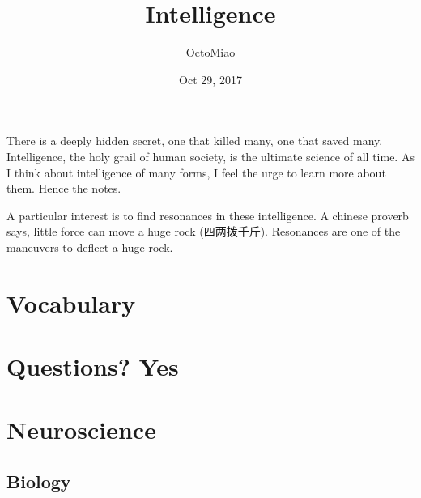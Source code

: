 \documentclass[letterpaper,10pt,english]{sphinxmanual}
\title{Intelligence}
\date{Oct 29, 2017}
\author{OctoMiao}
\begin{document}
\maketitle
\sphinxtableofcontents
{}\label{\detokenize{index::doc}}


There is a deeply hidden secret, one that killed many, one that saved many. Intelligence, the holy grail of human society, is the ultimate science of all time. As I think about intelligence of many forms, I feel the urge to learn more about them. Hence the notes.

A particular interest is to find resonances in these intelligence. A chinese proverb says, little force can move a huge rock (四两拨千斤). Resonances are one of the maneuvers to deflect a huge rock.


\chapter{Vocabulary}
\label{\detokenize{vocabulary::doc}}\label{\detokenize{vocabulary:intelligence}}\label{\detokenize{vocabulary:vocabulary}}

\chapter{Questions? Yes}
\label{\detokenize{questions:questions-yes}}\label{\detokenize{questions::doc}}

\chapter{Neuroscience}
\label{\detokenize{neuroscience/index::doc}}\label{\detokenize{neuroscience/index:neuroscience}}

\section{Biology}
\label{\detokenize{neuroscience/biology::doc}}\label{\detokenize{neuroscience/biology:biology}}
\end{document}
